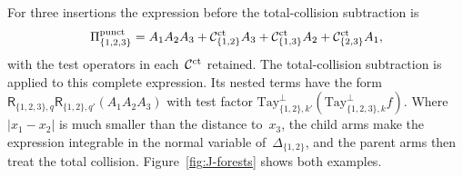 For three insertions the expression before the total-collision subtraction is
\begin{equation*}
\Pi_{\{1,2,3\}}^{\rm punct}
=A_1A_2A_3+\mathcal C_{\{1,2\}}^{\rm ct}A_3
+\mathcal C_{\{1,3\}}^{\rm ct}A_2+\mathcal C_{\{2,3\}}^{\rm ct}A_1,
\end{equation*}
with the test operators in each~$\mathcal C^{\rm ct}$ retained. The total-collision subtraction is applied to this complete expression. Its nested terms have the form $\mathsf R_{\{1,2,3\},q}\mathsf R_{\{1,2\},q'}(A_1A_2A_3)$ with test factor $\mathrm{Tay}^\perp_{\{1,2\},k'}(\mathrm{Tay}^\perp_{\{1,2,3\},k}f)$. Where $|x_1-x_2|$ is much smaller than the distance to~$x_3$, the child arms make the expression integrable in the normal variable of~$\Delta_{\{1,2\}}$, and the parent arms then treat the total collision. Figure~\ref{fig:J-forests} shows both examples.

